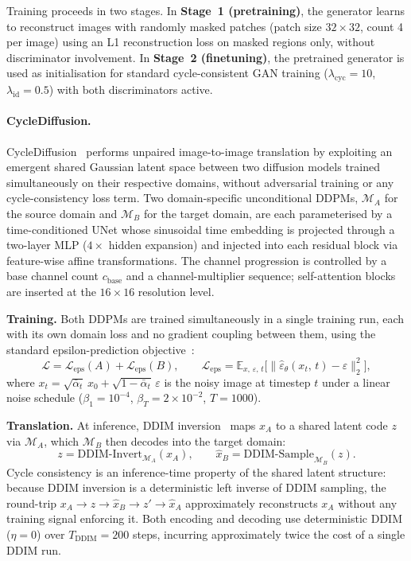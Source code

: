 Training proceeds in two stages.
In \textbf{Stage~1 (pretraining)}, the generator learns to reconstruct images with
randomly masked patches (patch size $32{\times}32$, count 4 per image) using an L1
reconstruction loss on masked regions only, without discriminator involvement.
In \textbf{Stage~2 (finetuning)}, the pretrained generator is used as initialisation
for standard cycle-consistent GAN training ($\lambda_{\text{cyc}}{=}10$,
$\lambda_{\text{id}}{=}0.5$) with both discriminators active.

\paragraph{CycleDiffusion.}
\label{sec:supp-cyclediffusion}

CycleDiffusion~\cite{wu2022cyclediffusion} performs unpaired image-to-image translation
by exploiting an emergent shared Gaussian latent space between two diffusion models trained
simultaneously on their respective domains, without adversarial training or any
cycle-consistency loss term.
Two domain-specific unconditional DDPMs, $\mathcal{M}_A$ for the source domain and
$\mathcal{M}_B$ for the target domain, are each parameterised by a time-conditioned UNet
whose sinusoidal time embedding is projected through a two-layer MLP ($4{\times}$ hidden
expansion) and injected into each residual block via feature-wise affine transformations.
The channel progression is controlled by a base channel count $c_{\text{base}}$ and a
channel-multiplier sequence; self-attention blocks are inserted at the
$16{\times}16$ resolution level.

\textbf{Training.}
Both DDPMs are trained simultaneously in a single training run, each with its own
domain loss and no gradient coupling between them, using the standard epsilon-prediction
objective~\cite{ho2020ddpm}:
\begin{equation}
  \mathcal{L} = \mathcal{L}_{\text{eps}}(A) + \mathcal{L}_{\text{eps}}(B), \qquad
  \mathcal{L}_{\text{eps}} = \mathbb{E}_{x,\,\varepsilon,\,t}
    \bigl[\|\hat{\varepsilon}_\theta(x_t,\,t) - \varepsilon\|_2^2\bigr],
\end{equation}
where $x_t = \sqrt{\bar\alpha_t}\,x_0 + \sqrt{1-\bar\alpha_t}\,\varepsilon$ is the
noisy image at timestep $t$ under a linear noise schedule
($\beta_1{=}10^{-4}$, $\beta_T{=}2{\times}10^{-2}$, $T{=}1000$).

\textbf{Translation.}
At inference, DDIM inversion~\cite{song2021ddim} maps $x_A$ to a shared latent code $z$
via $\mathcal{M}_A$, which $\mathcal{M}_B$ then decodes into the target domain:
\begin{equation}
  z = \mathrm{DDIM\text{-}Invert}_{\mathcal{M}_A}(x_A), \qquad
  \hat{x}_B = \mathrm{DDIM\text{-}Sample}_{\mathcal{M}_B}(z).
\end{equation}
Cycle consistency is an inference-time property of the shared latent structure: because
DDIM inversion is a deterministic left inverse of DDIM sampling, the round-trip
$x_A \to z \to \hat{x}_B \to z' \to \hat{x}_A$ approximately reconstructs $x_A$
without any training signal enforcing it.
Both encoding and decoding use deterministic DDIM ($\eta{=}0$) over $T_{\text{DDIM}}{=}200$
steps, incurring approximately twice the cost of a single DDIM run.

